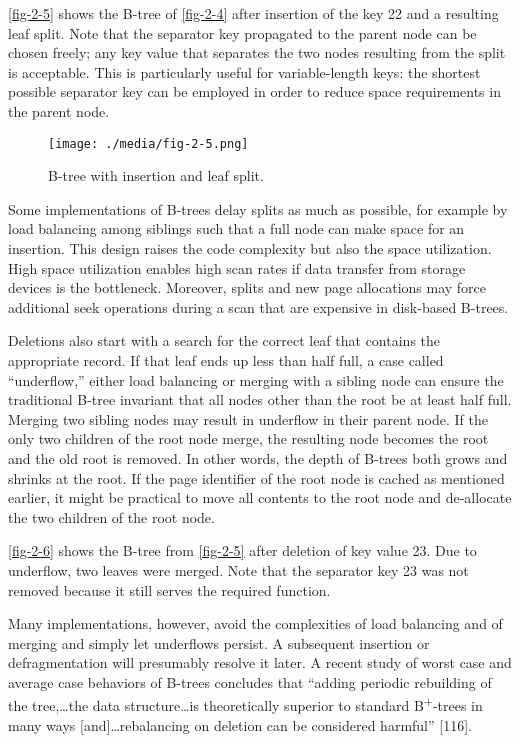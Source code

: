 \autoref{fig-2-5} shows the B-tree of \autoref{fig-2-4} after insertion of the key 22
and a resulting leaf split. Note that the separator key propagated to
the parent node can be chosen freely; any key value that separates the
two nodes resulting from the split is acceptable. This is particularly
useful for variable-length keys: the shortest possible separator key can
be employed in order to reduce space requirements in the parent node.

\begin{figure}
  \centering
  \texttt{[image: ./media/fig-2-5.png]}

  \caption{B-tree with insertion and leaf split.\label{fig-2-5}}
\end{figure}

Some implementations of B-trees delay splits as much as possible, for
example by load balancing among siblings such that a full node can make
space for an insertion. This design raises the code complexity but also
the space utilization. High space utilization enables high scan rates if
data transfer from storage devices is the bottleneck. Moreover, splits
and new page allocations may force additional seek operations during a
scan that are expensive in disk-based B-trees.

Deletions also start with a search for the correct leaf that contains
the appropriate record. If that leaf ends up less than half full, a case
called ``underflow,'' either load balancing or merging with a sibling
node can ensure the traditional B-tree invariant that all nodes other
than the root be at least half full. Merging two sibling nodes may
result in underflow in their parent node. If the only two children of
the root node merge, the resulting node becomes the root and the old
root is removed. In other words, the depth of B-trees both grows and
shrinks at the root. If the page identifier of the root node is cached
as mentioned earlier, it might be practical to move all contents to the
root node and de-allocate the two children of the root node.

\autoref{fig-2-6} shows the B-tree from \autoref{fig-2-5} after deletion of key value
23. Due to underflow, two leaves were merged. Note that the separator
key 23 was not removed because it still serves the required function.

Many implementations, however, avoid the complexities of load balancing
and of merging and simply let underflows persist. A subsequent insertion
or defragmentation will presumably resolve it later. A recent study of
worst case and average case behaviors of B-trees concludes that ``adding
periodic rebuilding of the tree,\ldots the data structure\ldots is
theoretically superior to standard B\textsuperscript{+}-trees in many
ways {[}and{]}\ldots rebalancing on deletion can be considered harmful''
{[}116{]}.

